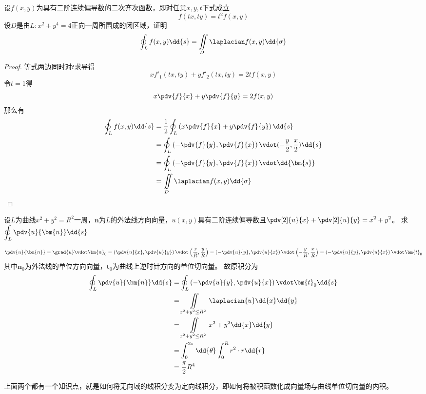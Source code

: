 \begin{example}
    设$f(x,y)$为具有二阶连续偏导数的二次齐次函数，即对任意$x,y,t$下式成立
    \[ f(tx,ty) = t^2f(x,y) \]
    设$D$是由$L:x^2+y^4=4$正向一周所围成的闭区域，证明
    \[ \oint_L f(x,y)\dd{s} = \iint\limits_D \laplacian f(x,y) \dd{\sigma} \]
\end{example}
\begin{proof}
    等式两边同时对$t$求导得
    \[ xf'_1(tx,ty) + yf'_2(tx,ty) = 2tf(x,y) \]
    令$t=1$得
    \[ x\pdv{f}{x} + y\pdv{f}{y} = 2f(x,y) \]
    那么有
    \begin{align*}
        \oint_L f(x,y)\dd{s}
         & = \frac{1}{2} \oint_L \left(x\pdv{f}{x} + y\pdv{f}{y}\right)\dd{s}                   \\
         & =  \oint_L \left(-\pdv{f}{y},\pdv{f}{x}\right) \vdot(-\frac{y}{2},\frac{x}{2})\dd{s} \\
         & =  \oint_L \left(-\pdv{f}{y},\pdv{f}{x}\right) \vdot\dd{\bm{s}}                      \\
         & = \iint\limits_D \laplacian f(x,y) \dd{\sigma}
    \end{align*}
\end{proof}

\begin{example}
    设$L$为曲线$x^2+y^2=R^2$一周，$\bm{n}$为$L$的外法线方向向量，$u(x,y)$具有二阶连续偏导数且$\displaystyle \pdv[2]{u}{x} + \pdv[2]{u}{y}=x^2+y^2$。
    求$\displaystyle\oint_L \pdv{u}{\bm{n}}\dd{s}$
\end{example}
\begin{solution}
    \[
        \pdv{u}{\bm{n}}
        = \grad{u}\vdot\bm{n}_0
        = \left(\pdv{u}{x},\pdv{u}{y}\right)\vdot\left(\frac{x}{R},\frac{y}{R}\right)
        = \left(-\pdv{u}{y},\pdv{u}{x}\right)\vdot\left(-\frac{y}{R},\frac{x}{R}\right)
        = \left(-\pdv{u}{y},\pdv{u}{x}\right)\vdot\bm{t}_0
    \]
    其中$\bm{n}_0$为外法线的单位方向向量，$\bm{t}_0$为曲线上逆时针方向的单位切向量。
    故原积分为
    \begin{align*}
        \oint_L \pdv{u}{\bm{n}}\dd{s}
         & = \oint_L \left(-\pdv{u}{y},\pdv{u}{x}\right)\vdot\bm{t}_0\dd{s} \\
         & = \iint\limits_{x^2+y^2\leq R^2} \laplacian{u} \dd{x}\dd{y}      \\
         & = \iint\limits_{x^2+y^2\leq R^2} x^2+y^2 \dd{x}\dd{y}            \\
         & = \int_0^{2\pi} \dd{\theta} \int_0^R r^2\cdot r \dd{r}           \\
         & =\frac{\pi}{2}R^4
    \end{align*}
\end{solution}
上面两个都有一个知识点，就是如何将无向域的线积分变为定向线积分，即如何将被积函数化成向量场与曲线单位切向量的内积。

